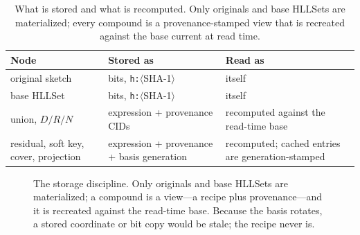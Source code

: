\documentclass[11pt,a4paper]{article}
\theoremstyle{remark}
\begin{document}
\begin{table}[t]
\centering
\small
\begin{tabular}{@{}p{}p{}p{}@{}}
\toprule
Node & Stored as & Read as \\
\midrule
original sketch & bits, \texttt{h:}$\langle$SHA-1$\rangle$ & itself \\
base HLLSet & bits, \texttt{h:}$\langle$SHA-1$\rangle$ & itself \\
union, $D/R/N$ & expression + provenance CIDs & recomputed against the read-time base \\
residual, soft key, cover, projection & expression + provenance + basis generation & recomputed; cached entries are generation-stamped \\
\bottomrule
\end{tabular}
\caption{What is stored and what is recomputed. Only originals and base
HLLSets are materialized; every compound is a provenance-stamped view that
is recreated against the base current at read time.}
\label{tab:views}
\end{table}

\begin{figure}[t]
\centering
{}
\caption{The storage discipline. Only originals and base HLLSets are
materialized; a compound is a view---a recipe plus provenance---and it is
recreated against the read-time base. Because the basis rotates, a stored
coordinate or bit copy would be stale; the recipe never is.}
\label{fig:views}
\end{figure}
\end{document}
